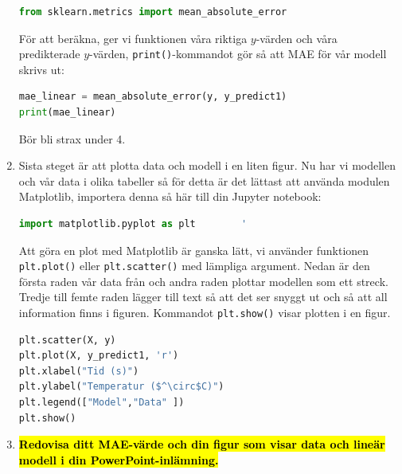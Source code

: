 \documentclass{article}
\begin{document}
\begin{enumerate}
\begin{lstlisting}[language=Python]
from sklearn.metrics import mean_absolute_error
\end{lstlisting}
    För att beräkna, ger vi funktionen våra riktiga $y$-värden och våra predikterade $y$-värden, \texttt{print()}-kommandot gör så att MAE för vår modell skrivs ut:
    \begin{lstlisting}[language=Python]
mae_linear = mean_absolute_error(y, y_predict1)
print(mae_linear)
\end{lstlisting}
    Bör bli strax under 4.
    \item Sista steget är att plotta data och modell i en liten figur. Nu har vi modellen och vår data i olika tabeller så för detta är det lättast att använda modulen Matplotlib, importera denna så här till din Jupyter notebook:
    \begin{lstlisting}[language=Python]
import matplotlib.pyplot as plt        '
\end{lstlisting}
    Att göra en plot med Matplotlib är ganska lätt, vi använder funktionen \texttt{plt.plot()} eller \texttt{plt.scatter()} med lämpliga argument. Nedan är den första raden vår data från och andra raden plottar modellen som ett streck. Tredje till femte raden lägger till text så att det ser snyggt ut och så att all information finns i figuren. Kommandot \texttt{plt.show()} visar plotten i en figur.
    \begin{lstlisting}[language=Python]
plt.scatter(X, y)
plt.plot(X, y_predict1, 'r')
plt.xlabel("Tid (s)")
plt.ylabel("Temperatur ($^\circ$C)")
plt.legend(["Model","Data" ])
plt.show()
\end{lstlisting}
    \item \hl{\textbf{Redovisa ditt MAE-värde och din figur som visar data och lineär modell i din PowerPoint-inlämning.}}
\end{enumerate}
\end{document}
